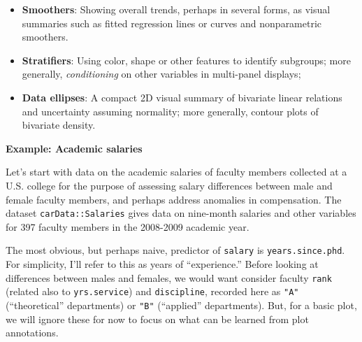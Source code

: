\documentclass[
  letterpaper,
  10pt,
  krantz2]{krantz}
\makeatletter
\newenvironment{Shaded}{\begin{snugshade}}{\end{snugshade}}
\newcommand{\AttributeTok}[1]{\textcolor[rgb]{0.40,0.45,0.13}{#1}}
\newcommand{\CommentTok}[1]{\textcolor[rgb]{0.37,0.37,0.37}{#1}}
\newcommand{\FunctionTok}[1]{\textcolor[rgb]{0.28,0.35,0.67}{#1}}
\newcommand{\NormalTok}[1]{\textcolor[rgb]{0.00,0.23,0.31}{#1}}
\newcommand{\StringTok}[1]{\textcolor[rgb]{0.13,0.47,0.30}{#1}}
\providecommand{\tightlist}{%
  \setlength{\itemsep}{0pt}\setlength{\parskip}{0pt}}\usepackage{longtable,booktabs,array}
\newenvironment{kframe}{%
  \medskip{}
  \setlength{\fboxsep}{.8em}
  \def\at@end@of@kframe{}%
  \ifinner\ifhmode%
  \def\at@end@of@kframe{\end{minipage}}%
  \begin{minipage}{\columnwidth}%
  \fi\fi%
  \def\FrameCommand##1{\hskip\@totalleftmargin \hskip-\fboxsep
  \colorbox{shadecolor}{##1}\hskip-\fboxsep
      \hskip-\linewidth \hskip-\@totalleftmargin \hskip\columnwidth}%
  \MakeFramed {\advance\hsize-\width
    \@totalleftmargin\z@ \linewidth\hsize
    \@setminipage}}%
{\par\unskip\endMakeFramed%
  \at@end@of@kframe}
\renewenvironment{Shaded}{\begin{kframe}}{\end{kframe}}
\makeatother
\begin{document}
\begin{itemize}
\tightlist
\item
  \textbf{Smoothers}: Showing overall trends, perhaps in several forms,
  as visual summaries such as fitted regression lines or curves and
  nonparametric smoothers.
\item
  \textbf{Stratifiers}: Using color, shape or other features to identify
  subgroups; more generally, \emph{conditioning} on other variables in
  multi-panel displays;
\item
  \textbf{Data ellipses}: A compact 2D visual summary of bivariate
  linear relations and uncertainty assuming normality; more generally,
  contour plots of bivariate density.
\end{itemize}

\textbf{Example: Academic salaries}

Let's start with data on the academic salaries of faculty members
collected at a U.S. college for the purpose of assessing salary
differences between male and female faculty members, and perhaps address
anomalies in compensation. The dataset \texttt{carData::Salaries} gives
data on nine-month salaries and other variables for 397 faculty members
in the 2008-2009 academic year.

\begin{Shaded}
\end{Shaded}

The most obvious, but perhaps naive, predictor of \texttt{salary} is
\texttt{years.since.phd}. For simplicity, I'll refer to this as years of
``experience.'' Before looking at differences between males and females,
we would want consider faculty \texttt{rank} (related also to
\texttt{yrs.service}) and \texttt{discipline}, recorded here as
\texttt{"A"} (``theoretical'' departments) or \texttt{"B"} (``applied''
departments). But, for a basic plot, we will ignore these for now to
focus on what can be learned from plot annotations.
\end{document}
